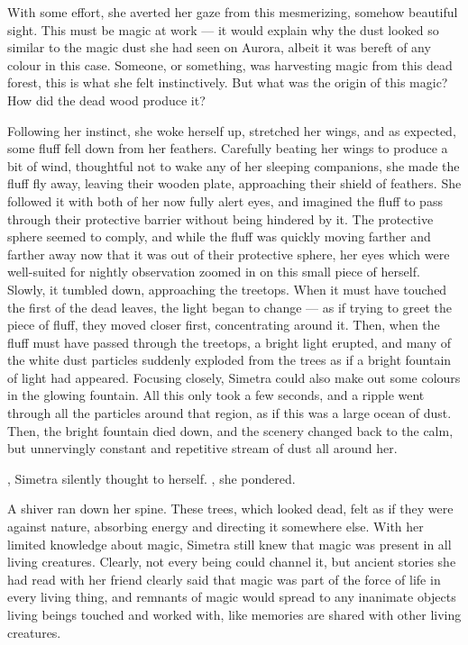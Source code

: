 With some effort, she averted her gaze from this mesmerizing, somehow beautiful sight. This must be magic at work --- it would explain why the dust looked so similar to the magic dust she had seen on Aurora, albeit it was bereft of any colour in this case. Someone, or something, was harvesting magic from this dead forest, this is what she felt instinctively. But what was the origin of this magic? How did the dead wood produce it?

Following her instinct, she woke herself up, stretched her wings, and as expected, some fluff fell down from her feathers. Carefully beating her wings to produce a bit of wind, thoughtful not to wake any of her sleeping companions, she made the fluff fly away, leaving their wooden plate, approaching their shield of feathers. She followed it with both of her now fully alert eyes, and imagined the fluff to pass through their protective barrier without being hindered by it. The protective sphere seemed to comply, and while the fluff was quickly moving farther and farther away now that it was out of their protective sphere, her eyes which were well-suited for nightly observation zoomed in on this small piece of herself. Slowly, it tumbled down, approaching the treetops. When it must have touched the first of the dead leaves, the light began to change --- as if trying to greet the piece of fluff, they moved closer first, concentrating around it. Then, when the fluff must have passed through the treetops, a bright light erupted, and many of the white dust particles suddenly exploded from the trees as if a bright fountain of light had appeared. Focusing closely, Simetra could also make out some colours in the glowing fountain. All this only took a few seconds, and a ripple went through all the particles around that region, as if this was a large ocean of dust. Then, the bright fountain died down, and the scenery changed back to the calm, but unnervingly constant and repetitive stream of dust all around her.

, Simetra silently thought to herself. , she pondered. 

A shiver ran down her spine. These trees, which looked dead, felt as if they were against nature, absorbing energy and directing it somewhere else. With her limited knowledge about magic, Simetra still knew that magic was present in all living creatures. Clearly, not every being could channel it, but ancient stories she had read with her friend clearly said that magic was part of the force of life in every living thing, and remnants of magic would spread to any inanimate objects living beings touched and worked with, like memories are shared with other living creatures.

